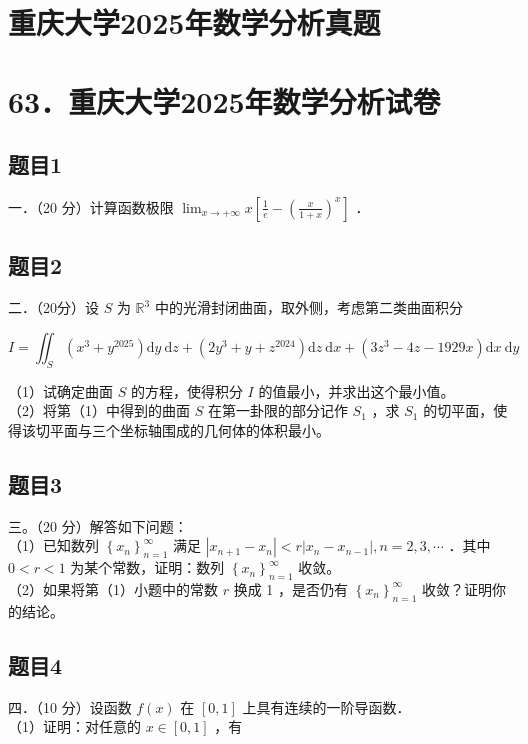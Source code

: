 \documentclass{article}
\begin{document}
\section*{重庆大学2025年数学分析真题}
\section*{63．重庆大学2025年数学分析试卷}

\subsection{题目1}
一．（20 分）计算函数极限 \(\lim _{x \rightarrow+\infty} x\left[\frac{1}{e}-\left(\frac{x}{1+x}\right)^{x}\right]\) ．

\subsection{题目2}
二．（20分）设 \(S\) 为 \(\mathbb{R}^{3}\) 中的光滑封闭曲面，取外侧，考虑第二类曲面积分

\[
I=\iint_{S}\left(x^{3}+y^{2025}\right) \mathrm{d} y \mathrm{~d} z+\left(2 y^{3}+y+z^{2024}\right) \mathrm{d} z \mathrm{~d} x+\left(3 z^{3}-4 z-1929 x\right) \mathrm{d} x \mathrm{~d} y
\]

（1）试确定曲面 \(S\) 的方程，使得积分 \(I\) 的值最小，并求出这个最小值。\\
（2）将第（1）中得到的曲面 \(S\) 在第一卦限的部分记作 \(S_{1}\) ，求 \(S_{1}\) 的切平面，使得该切平面与三个坐标轴围成的几何体的体积最小。

\subsection{题目3}
三。（20 分）解答如下问题：\\
（1）已知数列 \(\left\{x_{n}\right\}_{n=1}^{\infty}\) 满足 \(\left|x_{n+1}-x_{n}\right|<r\left|x_{n}-x_{n-1}\right|, n=2,3, \cdots\) ．其中 \(0<r<1\) 为某个常数，证明：数列 \(\left\{x_{n}\right\}_{n=1}^{\infty}\) 收敛。\\
（2）如果将第（1）小题中的常数 \(r\) 换成 1 ，是否仍有 \(\left\{x_{n}\right\}_{n=1}^{\infty}\) 收敛？证明你的结论。

\subsection{题目4}
四．（10 分）设函数 \(f(x)\) 在 \([0,1]\) 上具有连续的一阶导函数．\\
（1）证明：对任意的 \(x \in[0,1]\) ，有
\end{document}
